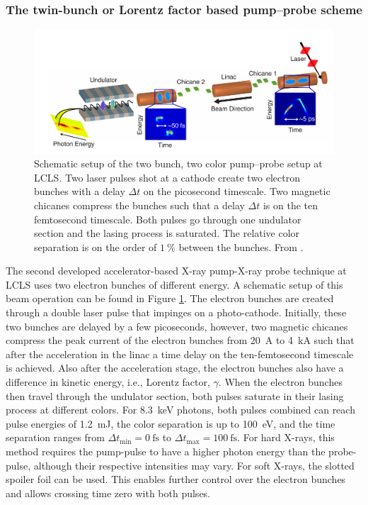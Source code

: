 \subsubsection{The twin-bunch or Lorentz factor based pump--probe scheme}\label{sec:twin-bunch-pump-probe}
\begin{figure}
	\centering
		\includegraphics[width=1.00\textwidth]{images/Agos-pump-probe-scheme.png}
	\caption[Schematic setup of a bunch based pump-probe setup.]{Schematic setup of the two bunch, two color pump--probe setup at LCLS. Two laser pulses shot at a cathode create two electron bunches with a delay $\Delta t$ on the picosecond timescale. Two magnetic chicanes compress the bunches such that a delay $\Delta t$ is on the ten femtosecond timescale. Both pulses go through one undulator section and the lasing process is saturated. The relative color separation is on the order of $\SI{1}{\percent}$ between the bunches. From \cite{Marinelli-2015-NatComm}.}
	\label{fig:Agos-pump-probe-scheme}
\end{figure}
The second developed accelerator-based X-ray pump-X-ray probe technique at LCLS \citep{Marinelli-2015-NatComm} uses two electron bunches of different energy. A schematic setup of this beam operation can be found in Figure \ref{fig:Agos-pump-probe-scheme}. The electron bunches are created through a double laser pulse that impinges on a photo-cathode. Initially, these two bunches are delayed by a few picoseconds, however, two magnetic chicanes compress the peak current of the electron bunches from \SI{20}{\ampere} to \SI{4}{\kilo\ampere} such that after the acceleration in the linac a time delay on the ten-femtosecond timescale is achieved. Also after the acceleration stage, the electron bunches also have a difference in kinetic energy, i.e., Lorentz factor, $\gamma$. When the electron bunches then travel through the undulator section, both pulses saturate in their lasing process at different colors. For \SI{8.3}{\kilo\electronvolt} photons, both pulses combined can reach pulse energies of \SI{1.2}{\milli\joule}, the color separation is up to \SI{100}{\electronvolt}, and the time separation ranges from $\Delta t_{\text{min}}=\SI{0}{\femto\second}$ to $\Delta t_{\text{max}}=\SI{100}{\femto\second}$. For hard X-rays, this method requires the pump-pulse to have a higher photon energy than the probe-pulse, although their respective intensities may vary. For soft X-rays, the slotted spoiler foil can be used. This enables further control over the electron bunches and allows crossing time zero with both pulses.
